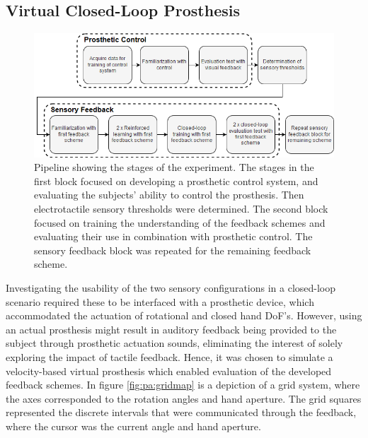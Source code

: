 
\subsection{Virtual Closed-Loop Prosthesis}
 \begin{figure}[h]
		\includegraphics[width=.85\textwidth]{figures/std_paper}
	\caption{Pipeline showing the stages of the experiment. The stages in the first block focused on developing a prosthetic control system, and evaluating the subjects' ability to control the prosthesis. Then electrotactile sensory thresholds were determined. The second block focused on training the understanding of the feedback schemes and evaluating their use in combination with prosthetic control. The sensory feedback block was repeated for the remaining feedback scheme.}
	\label{fig:pa:std_pap} 
\end{figure}
Investigating the usability of the two sensory configurations in a closed-loop scenario required these to be interfaced with a prosthetic device, which accommodated the actuation of rotational and closed hand DoF's. However, using an actual prosthesis might result in auditory feedback being provided to the subject through prosthetic actuation sounds, eliminating the interest of solely exploring the impact of tactile feedback. Hence, it was chosen to simulate a velocity-based virtual prosthesis which enabled evaluation of the developed feedback schemes. In figure \ref{fig:pa:gridmap} is a depiction of a grid system, where the axes corresponded to the rotation angles and hand aperture. The grid squares represented the discrete intervals that were communicated through the feedback, where the cursor was the current angle and hand aperture. 
